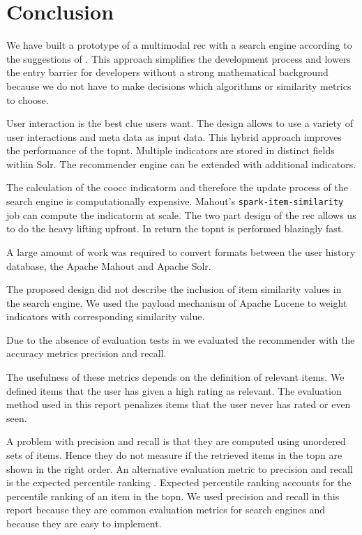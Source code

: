 \section{Conclusion}
\label{sec:conclusion}

We have built a prototype of a \gls{multimodal} \gls{rec} with a search engine according to the suggestions of \cite{Dunning14}. 
This approach simplifies the development process and lowers the entry barrier for developers without a strong mathematical background because we do not have to make decisions which algorithms or similarity metrics to choose. 

User interaction is the best clue users want.
The design allows to use a variety of user interactions and meta data as input data. This hybrid approach improves the performance of the \gls{topnt}. Multiple \glspl{indicator} are stored in distinct fields within Solr. The recommender engine can be extended with additional \glspl{indicator}.

The calculation of the \gls{coocc} \gls{indicatorm} and therefore the update process of the search engine is computationally expensive. Mahout's \verb|spark-item-similarity| job can compute the \gls{indicatorm} at scale.
The two part design of the \gls{rec} allows us to do the heavy lifting upfront. In return the \gls{topnt} is performed blazingly fast.

A large amount of work was required to convert formats between the user history database, the Apache Mahout and Apache Solr. 

The proposed design did not describe the inclusion of item similarity values in the search engine. We used the payload mechanism of Apache Lucene to weight indicators with corresponding similarity value.

Due to the absence of evaluation tests in \cite{Dunning14} we evaluated the recommender with the accuracy metrics \gls{precision} and \gls{recall}. 

The usefulness of these metrics depends on the definition of relevant items. We defined items that the user has given a high rating as relevant. The evaluation method used in this report penalizes items that the user never has rated or even seen. 

A problem with precision and recall is that they are computed using unordered sets of items. Hence they do not measure if the retrieved items in the \gls{topn} are shown in the right order. An alternative evaluation metric to precision and recall is the expected percentile ranking \cite{Hu}. Expected percentile ranking accounts for the percentile ranking of an item in the \gls{topn}. We used precision and recall in this report because they are common evaluation metrics for search engines \cite{grainger} and because they are easy to implement.

